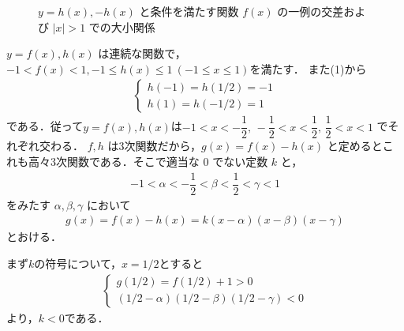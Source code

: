 \documentclass[../../main.tex]{subfiles}
\begin{document}
\begin{figure}[htb]
  \caption{$y=h(x), -h(x)$ と条件を満たす関数 $f(x)$ の一例の交差および $|x|>1$ での大小関係}
  \label{fig:chebyshev_extremal_comparison_exact}
\end{figure}

$y=f(x), h(x)$ は連続な関数で，$-1 < f(x) < 1, -1 \le h(x) \le 1 \ (-1 \le x \le 1)$を満たす．
また(1)から
\begin{align}
  \begin{cases}
    h(-1) = h(1/2) = -1 \\
    h(1)  = h(-1/2)  = 1
  \end{cases}
\end{align}
である．従って$y=f(x),h(x)$は$-1 < x < -\dfrac{1}{2}, \, -\dfrac{1}{2} < x < \dfrac{1}{2}, \, \dfrac{1}{2} < x < 1$ でそれぞれ交わる．
$f, h$ は3次関数だから，$g(x) = f(x) - h(x)$ と定めるとこれも高々$3$次関数である．そこで適当な $0$ でない定数 $k$ と，
\begin{align}
  -1 < \alpha < -\dfrac{1}{2} < \beta < \dfrac{1}{2} < \gamma < 1 \label{eq:5}
\end{align}
をみたす $\alpha, \beta, \gamma$ において
\begin{align}
  g(x) = f(x) - h(x) = k(x-\alpha)(x-\beta)(x-\gamma) \label{eq:6}
\end{align}
とおける．

まず$k$の符号について，$x=1/2$とすると
\begin{align}
  \begin{cases}
    g(1/2) = f(1/2) +1 > 0 \\
    (1/2-\alpha)(1/2-\beta)(1/2-\gamma) < 0
  \end{cases}
\end{align}
より，$k<0$である．
\end{document}
